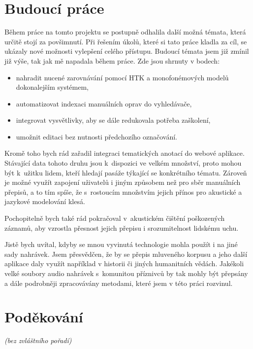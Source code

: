 \section{Budoucí práce}

Během práce na tomto projektu se postupně odhalila další možná témata, která určitě stojí za povšimnutí.
Při řešením úkolů, které si tato práce kladla za cíl, se ukázaly nové možnosti
vylepšení celého přístupu. Budoucí témata jsem již zmínil již výše, tak jak mě
napadala během práce. Zde jsou shrnuty v bodech:

\begin{itemize}
\item{nahradit nucené zarovnávání pomocí HTK a monofonémových modelů
dokonalejším systémem,}
\item{automatizovat indexaci manuálních oprav do vyhledávače,}
\item{integrovat vysvětlivky, aby se dále redukovala potřeba zaškolení,}
\item{umožnit editaci bez nutnosti předchozího označování.}
\end{itemize}

Kromě toho bych rád zařadil integraci tematických anotací do webové aplikace.
Stávající data tohoto druhu jsou k~dispozici ve velkém množství, proto mohou být
k~užitku lidem, kteří hledají pasáže týkající se konkrétního tématu. Zároveň je
možné využít zapojení uživatelů i jiným způsobem než pro sběr manuálních
přepisů, a to tím spíše, že s~rostoucím množstvím jejich přínos pro akustické a
jazykové modelování klesá.


Pochopitelně bych také rád pokračoval v~akustickém čištění poškozených záznamů,
aby vzrostla přesnost jejich přepisu i srozumitelnost lidskému uchu.

Jistě bych uvítal, kdyby se mnou vyvinutá technologie mohla použít i na jiné
sady nahrávek. Jsem přesvědčen, že by se přepis mluveného korpusu a jeho další
aplikace daly využít například v historii či jiných humanitních vědách. Jakékoli
velké soubory audio nahrávek s~komunitou příznivců by tak mohly být přepsány a
dále podrobněji zpracovávány metodami, které jsem v této práci rozvinul.


\section{Poděkování}

{\em (bez zvláštního pořadí)}\\

